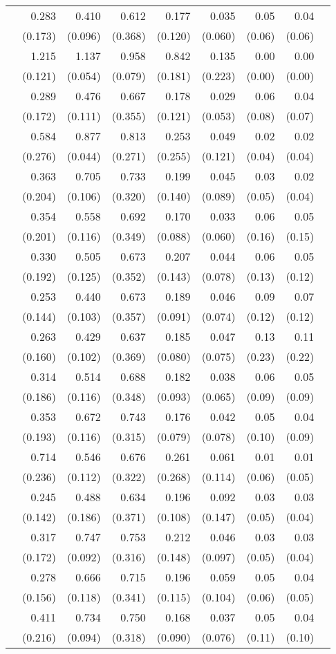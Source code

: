 \begin{longtable}{rrrrrrrrr}
\addlinespace[0.05cm] 96&0.283&0.410&0.612&0.177&0.035&0.05&0.04\\&(0.173)&(0.096)&(0.368)&(0.120)&(0.060)&(0.06)&(0.06) \\ \addlinespace[0.05cm] 97&1.215&1.137&0.958&0.842&0.135&0.00&0.00\\&(0.121)&(0.054)&(0.079)&(0.181)&(0.223)&(0.00)&(0.00) \\ \addlinespace[0.05cm] 98&0.289&0.476&0.667&0.178&0.029&0.06&0.04\\&(0.172)&(0.111)&(0.355)&(0.121)&(0.053)&(0.08)&(0.07) \\ \addlinespace[0.05cm] 99&0.584&0.877&0.813&0.253&0.049&0.02&0.02\\&(0.276)&(0.044)&(0.271)&(0.255)&(0.121)&(0.04)&(0.04) \\ \addlinespace[0.05cm] 100&0.363&0.705&0.733&0.199&0.045&0.03&0.02\\&(0.204)&(0.106)&(0.320)&(0.140)&(0.089)&(0.05)&(0.04) \\ \addlinespace[0.05cm] 101&0.354&0.558&0.692&0.170&0.033&0.06&0.05\\&(0.201)&(0.116)&(0.349)&(0.088)&(0.060)&(0.16)&(0.15) \\ \addlinespace[0.05cm] 102&0.330&0.505&0.673&0.207&0.044&0.06&0.05\\&(0.192)&(0.125)&(0.352)&(0.143)&(0.078)&(0.13)&(0.12) \\ \addlinespace[0.05cm] 103&0.253&0.440&0.673&0.189&0.046&0.09&0.07\\&(0.144)&(0.103)&(0.357)&(0.091)&(0.074)&(0.12)&(0.12) \\ \addlinespace[0.05cm] 104&0.263&0.429&0.637&0.185&0.047&0.13&0.11\\&(0.160)&(0.102)&(0.369)&(0.080)&(0.075)&(0.23)&(0.22) \\ \addlinespace[0.05cm] 105&0.314&0.514&0.688&0.182&0.038&0.06&0.05\\&(0.186)&(0.116)&(0.348)&(0.093)&(0.065)&(0.09)&(0.09) \\ \addlinespace[0.05cm] 106&0.353&0.672&0.743&0.176&0.042&0.05&0.04\\&(0.193)&(0.116)&(0.315)&(0.079)&(0.078)&(0.10)&(0.09) \\ \addlinespace[0.05cm] 107&0.714&0.546&0.676&0.261&0.061&0.01&0.01\\&(0.236)&(0.112)&(0.322)&(0.268)&(0.114)&(0.06)&(0.05) \\ \addlinespace[0.05cm] 108&0.245&0.488&0.634&0.196&0.092&0.03&0.03\\&(0.142)&(0.186)&(0.371)&(0.108)&(0.147)&(0.05)&(0.04) \\ \addlinespace[0.05cm] 109&0.317&0.747&0.753&0.212&0.046&0.03&0.03\\&(0.172)&(0.092)&(0.316)&(0.148)&(0.097)&(0.05)&(0.04) \\ \addlinespace[0.05cm] 110&0.278&0.666&0.715&0.196&0.059&0.05&0.04\\&(0.156)&(0.118)&(0.341)&(0.115)&(0.104)&(0.06)&(0.05) \\ \addlinespace[0.05cm] 111&0.411&0.734&0.750&0.168&0.037&0.05&0.04\\&(0.216)&(0.094)&(0.318)&(0.090)&(0.076)&(0.11)&(0.10) \\ 
\end{longtable}
